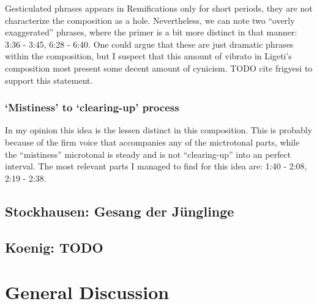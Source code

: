 \documentclass[a4paper,11pt]{article}
\begin{document}
Gesticulated phrases appears in Remifications only for short periods, they are not characterize the composition as a hole.
Nevertheless, we can note two ``overly exaggerated'' phrases, where the primer is a bit more distinct in that manner: 3:36 - 3:45, 6:28 - 6:40.
One could argue that these are just dramatic phrases within the composition, but I suspect that this amount of vibrato in Ligeti's composition most present some decent amount of cynicism.
TODO cite frigyesi to support this statement.

\subsubsection{‘Mistiness’ to ‘clearing-up’ process}

In my opinion this idea is the lessen distinct in this composition.
This is probably because of the firm voice that accompanies any of the mictrotonal parts, while the ``mistiness'' microtonal is steady and is not ``clearing-up'' into an perfect interval.
The most relevant parts I managed to find for this idea are: 1:40 - 2:08, 2:19 - 2:38.

\subsection{Stockhausen: Gesang der J{\"u}nglinge}
\label{sub:composition_stockhausen}

\subsection{Koenig: TODO}
\label{sub:composition_koenig}

\section{General Discussion}
\label{sec:general_discussion}

\printbibliography[title={Bibliography}]
\end{document}
